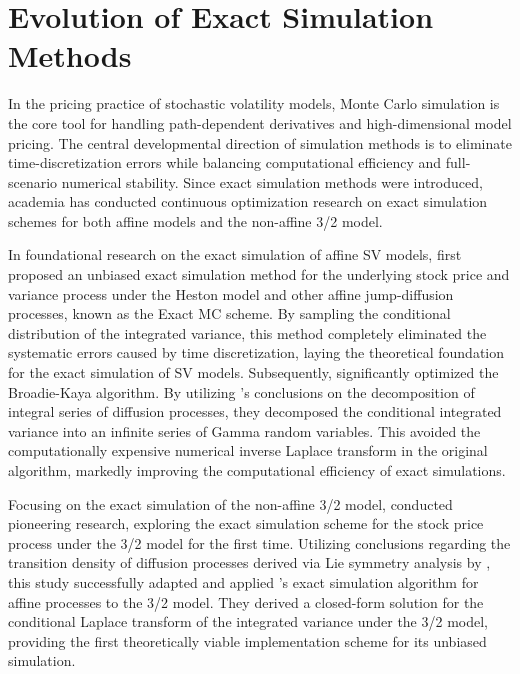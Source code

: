 \section{Evolution of Exact Simulation Methods}

In the pricing practice of stochastic volatility models, Monte Carlo simulation is the core tool for handling path-dependent derivatives and high-dimensional model pricing. The central developmental direction of simulation methods is to eliminate time-discretization errors while balancing computational efficiency and full-scenario numerical stability. Since exact simulation methods were introduced, academia has conducted continuous optimization research on exact simulation schemes for both affine models and the non-affine 3/2 model.

In foundational research on the exact simulation of affine SV models, \citet{broadieExactSimulationStochastic2006} first proposed an unbiased exact simulation method for the underlying stock price and variance process under the Heston model and other affine jump-diffusion processes, known as the Exact MC scheme. By sampling the conditional distribution of the integrated variance, this method completely eliminated the systematic errors caused by time discretization, laying the theoretical foundation for the exact simulation of SV models. Subsequently, \citet{glassermanGammaExpansionHeston2011} significantly optimized the Broadie-Kaya algorithm. By utilizing \citet{pitmanDecompositionBesselBridges1982}'s conclusions on the decomposition of integral series of diffusion processes, they decomposed the conditional integrated variance into an infinite series of Gamma random variables. This avoided the computationally expensive numerical inverse Laplace transform in the original algorithm, markedly improving the computational efficiency of exact simulations.

Focusing on the exact simulation of the non-affine 3/2 model, \citet{baldeauxEXACTSIMULATION322012} conducted pioneering research, exploring the exact simulation scheme for the stock price process under the 3/2 model for the first time. Utilizing conclusions regarding the transition density of diffusion processes derived via Lie symmetry analysis by \citet{craddockCalculationExpectationsClasses2009}, this study successfully adapted and applied \citet{broadieExactSimulationStochastic2006}'s exact simulation algorithm for affine processes to the 3/2 model. They derived a closed-form solution for the conditional Laplace transform of the integrated variance under the 3/2 model, providing the first theoretically viable implementation scheme for its unbiased simulation.

